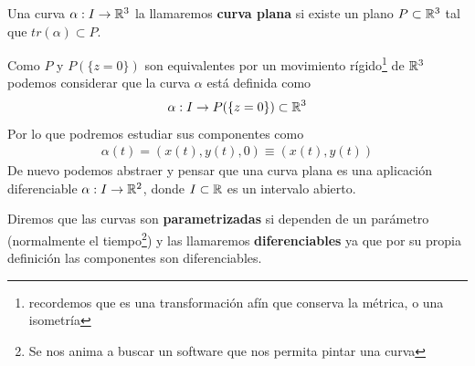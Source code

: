 \begin{definicion}
    Una curva $\alpha: I \to \mathbb{R}^3$ la llamaremos \textbf{curva plana} si existe un plano $P\subset \mathbb{R}^3$ tal que $tr(\alpha)\subset P$.

    Como $P$ y $P(\{z=0\})$ son equivalentes por un movimiento rígido\footnote{recordemos que es una transformación afín que conserva la métrica, o una isometría} de $\mathbb{R}^3$ podemos considerar que la curva $\alpha$ está definida como 
    \begin{gather*}
        \alpha: I \to P(\{z=0\})\subset \mathbb{R}^3
    \end{gather*}
    Por lo que podremos estudiar sus componentes como 
    \begin{gather*}
        \alpha(t) = (x(t), y(t), 0) \equiv (x(t),y(t))
    \end{gather*}
    De nuevo podemos abstraer y pensar que una curva plana es una aplicación diferenciable $\alpha: I \to \mathbb{R}^2$, donde $I\subset \mathbb{R}$ es un intervalo abierto.
\end{definicion}

\begin{observacion} %
    Diremos que las curvas son \textbf{parametrizadas} si dependen de un parámetro (normalmente el tiempo\footnote{Se nos anima a buscar un software que nos permita pintar una curva}) y las llamaremos \textbf{diferenciables} ya que por su propia definición las componentes son diferenciables.
\end{observacion}

